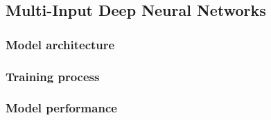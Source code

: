\subsection{Multi-Input Deep Neural Networks}
\label{sec:deep_combined}




\subsubsection{Model architecture}
\label{sub:comb_model_architecture}

\subsubsection{Training process}
\label{sub:comb_training_process}

\subsubsection{Model performance}
\label{sub:comb_performance}

